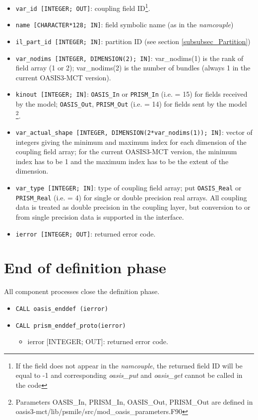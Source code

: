 \begin{itemize}
  \begin{itemize}
  \item {\tt var\_id [INTEGER; OUT]}: coupling field ID\footnote{If
      the field does not appear in the {\it namcouple}, the returned
      field ID will be equal to -1 and corresponding {\it oasis\_put}
      and {\it oasis\_get} cannot be called in the code}.
  \item {\tt name [CHARACTER*128; IN]}: field symbolic name (as in the
    {\it namcouple})
  \item {\tt il\_part\_id [INTEGER; IN]}: partition ID (see section
    \ref{subsubsec_Partition})
  \item {\tt var\_nodims [INTEGER, DIMENSION(2); IN]}: var\_nodims(1)
    is the rank of field array (1 or 2); var\_nodims(2) is the number
    of bundles (always 1 in the current OASIS3-MCT version).
  \item {\tt kinout [INTEGER; IN]}: {\tt OASIS\_In} or {\tt PRISM\_In}
    (i.e. = 15) for fields received by the model; {\tt OASIS\_Out},
    {\tt PRISM\_Out} (i.e. = 14) for fields sent by the model
    \footnote{Parameters OASIS\_In, PRISM\_In, OASIS\_Out, PRISM\_Out
      are defined in
      oasis3-mct/lib/psmile/src/mod\_oasis\_parameters.F90}.
  \item {\tt var\_actual\_shape [INTEGER, DIMENSION(2*var\_nodims(1));
      IN]}: vector of integers giving the minimum and maximum index
    for each dimension of the coupling field array; for the current
    OASIS3-MCT version, the minimum index has to be 1 and the maximum
    index has to be the extent of the dimension.
  \item {\tt var\_type [INTEGER; IN]}: type of coupling field array;
    put {\tt OASIS\_Real} or {\tt PRISM\_Real} (i.e. = 4) for single
    or double precision real arrays.  All coupling data is treated as
    double precision in the coupling layer, but conversion to or from
    single precision data is supported in the interface.
  \item {\tt ierror [INTEGER; OUT]}: returned error code.
  \end{itemize}
\end{itemize}

\section{End of definition phase}
\label{subsubsec_Endofdefinition}
All component processes close the definition phase.
\begin{itemize}
\item {\tt CALL oasis\_enddef (ierror)}
\item {\tt CALL prism\_enddef\_proto(ierror)}
  \begin{itemize}
  \item ierror [INTEGER; OUT]: returned error code.
  \end{itemize}
\end{itemize}

